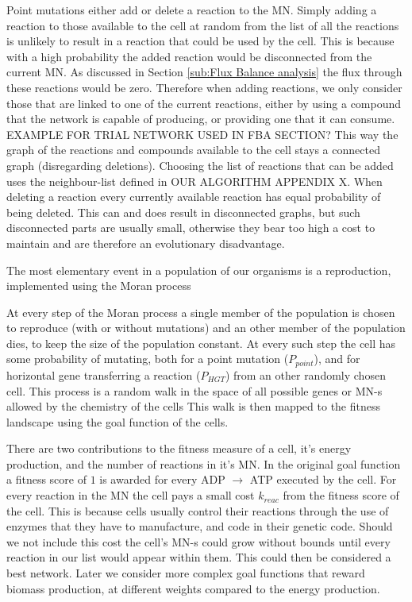 \documentclass[a4paper,12pt]{article}
\begin{document}
	Point mutations either add or delete a reaction to the MN. Simply adding a reaction to those available to the cell at random from the list of all the reactions is unlikely to result in a reaction that could be used by the cell. This is because with a high probability the added reaction would be disconnected from the current MN. As discussed in Section \ref{sub:Flux Balance analysis} the flux through these reactions would be zero. Therefore when adding reactions, we only consider those that are linked  to one of the current reactions, either by using a compound that  the network is capable of producing, or providing one that it can consume. EXAMPLE FOR TRIAL NETWORK USED IN FBA SECTION? This way the graph of the reactions and compounds available to the cell stays a connected graph (disregarding deletions). Choosing the list of reactions that can be added uses the neighbour-list defined in OUR ALGORITHM APPENDIX X. When deleting a reaction every currently available reaction has equal probability of being deleted. This can and does result in disconnected graphs, but such disconnected parts are usually small, otherwise they bear too high a cost to maintain and are therefore an evolutionary disadvantage.
	
The most elementary event in a population of our organisms is a reproduction, implemented using the Moran process \cite{moranprocess} 

At every step of the Moran process a single member of the population is chosen to reproduce (with or without mutations) and an other member of the population dies, to keep the size of the population constant. At every such step the cell has some probability of mutating, both for a point mutation ($P_{point}$), and for horizontal gene transferring a reaction ($P_{HGT}$) from an other randomly chosen cell.  This process is a random walk in the space of all possible genes or MN-s allowed by the chemistry of the cells  This walk is then mapped to the fitness landscape using the goal function of the cells.

There are two contributions to the fitness measure of a cell, it's energy production, and the number of reactions in it's MN.  In the original goal function a fitness score of $1$ is awarded for every ADP $\rightarrow$ ATP executed by the cell. For every reaction in the MN the cell pays a small cost $k_{reac}$  from the fitness score of the cell. This is because cells usually control their reactions through the use of enzymes that they have to manufacture, and code in their genetic code. Should we not include this cost the cell's MN-s could grow without bounds until every reaction in our list would appear within them. This could then be considered a best network. Later we consider more complex goal functions that reward biomass production, at different weights compared to the energy production. 
\end{document}
